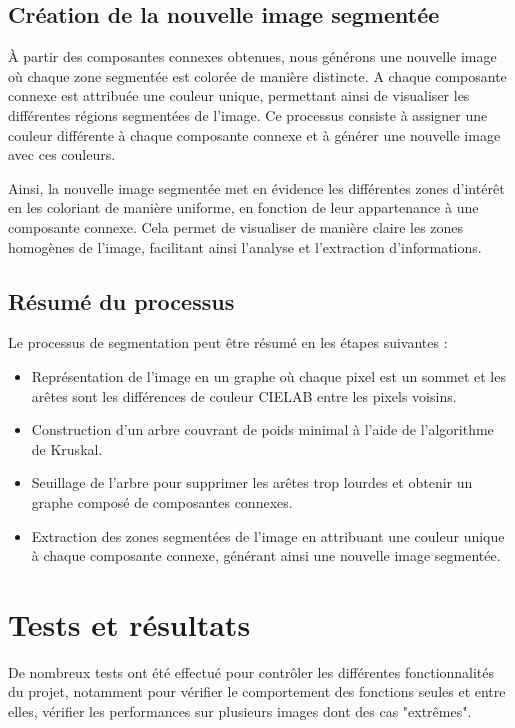 \documentclass[a4paper,12pt]{report}
\begin{document}
\section{Création de la nouvelle image segmentée}

À partir des composantes connexes obtenues, nous générons une nouvelle image où chaque zone segmentée est colorée de manière distincte. A chaque composante connexe est attribuée une couleur unique, permettant ainsi de visualiser les différentes régions segmentées de l'image. Ce processus consiste à assigner une couleur différente à chaque composante connexe et à générer une nouvelle image avec ces couleurs.

Ainsi, la nouvelle image segmentée met en évidence les différentes zones d'intérêt en les coloriant de manière uniforme, en fonction de leur appartenance à une composante connexe. Cela permet de visualiser de manière claire les zones homogènes de l'image, facilitant ainsi l'analyse et l'extraction d'informations.

\section{Résumé du processus}

Le processus de segmentation peut être résumé en les étapes suivantes :
\begin{itemize}
    \item Représentation de l'image en un graphe où chaque pixel est un sommet et les arêtes sont les différences de couleur CIELAB entre les pixels voisins.
    \item Construction d'un arbre couvrant de poids minimal à l'aide de l'algorithme de Kruskal.
    \item Seuillage de l'arbre pour supprimer les arêtes trop lourdes et obtenir un graphe composé de composantes connexes.
    \item Extraction des zones segmentées de l'image en attribuant une couleur unique à chaque composante connexe, générant ainsi une nouvelle image segmentée.
\end{itemize}

\chapter{Tests et résultats}

De nombreux tests ont été effectué pour contrôler les différentes fonctionnalités du projet, notamment pour vérifier le comportement des fonctions seules et entre elles, vérifier les performances sur plusieurs images dont des cas "extrêmes".
\end{document}
